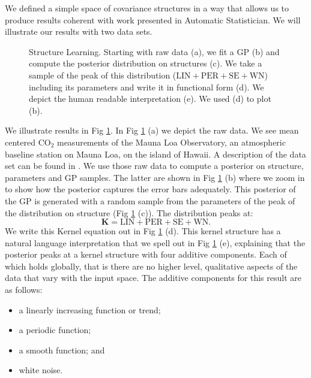 

We defined a simple space of covariance structures in a way that allows us to produce results coherent with 
work presented in Automatic Statistician. We will illustrate our results with two data sets.

\begin{figure}
\centering

\caption{\small Structure Learning. Starting with raw data (a), we fit a \ac{GP}
(b) and compute the posterior distribution on structures (c). We take a sample
of the peak of this distribution ($\text{LIN}+\text{PER}+\text{SE}+\text{WN}$)
including its parameters and write it in functional form (d). We depict the
human readable interpretation (e). We used (d) to plot (b).}\label{fig:posterior}
\end{figure}
We illustrate results in Fig \ref{fig:posterior}. In Fig \ref{fig:posterior} (a) we depict the raw data. 
We see mean centered CO$_2$ measurements of the Mauna Loa Observatory, an atmospheric
baseline station on Mauna Loa, on the island of Hawaii. 
A description of the data set  can be found in  \citealp[][chapter 5]{rasmussen2006gaussian}.  
We use those raw data to compute a posterior on structure, parameters and \ac{GP}
samples.
The latter are shown in  Fig \ref{fig:posterior} (b)
where we zoom in to show how the posterior captures the error bars
adequately.
This posterior of the \ac{GP} is generated with a random sample from the parameters
of the peak of the distribution on structure (Fig \ref{fig:posterior} (c)).
The distribution peaks at:
\begin{equation}
\mathbf{K}=\text{LIN} + \text{PER} + \text{SE} + \text{WN}.
\end{equation}
We write this Kernel equation out in Fig \ref{fig:posterior} (d).
This kernel structure has a natural language interpretation that we spell out in
Fig \ref{fig:posterior} (e), explaining that 
the posterior peaks at a kernel structure with four additive components.
Each of which holds globally, that is there are no higher level, qualitative aspects
of the data that vary with the input space. The additive components for this result are as follows:
\begin{itemize}
\item a linearly increasing function or trend; 
\item a periodic function;
\item a smooth function; and
\item white noise.
\end{itemize}
 



